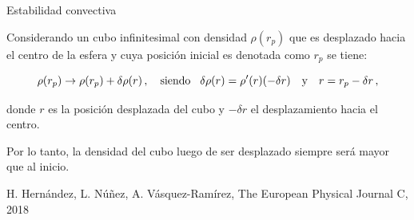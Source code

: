 \documentclass[handout,t]{beamer}
\begin{document}
\begin{frame}{Estabilidad convectiva}
\justifying

\vspace{2mm}
Considerando un cubo infinitesimal con densidad $\rho (r_{p})$ que es desplazado hacia el centro de la esfera y cuya posición inicial es denotada como $r_{p}$ se tiene:

\vspace{-2mm}

\begin{equation*}
    \rho (r_{p}) \rightarrow \rho (r_{p}) + \delta \rho(r) \, , \quad \text{siendo} \hspace{3mm} \delta \rho (r) = \rho^{\prime} (r)(- \delta r) \quad \text{y} \quad r = r_{p} - \delta r \, , 
\end{equation*}

\vspace{4mm}

donde $r$ es la posición desplazada del cubo y $- \delta r$ el desplazamiento hacia el centro.

\vspace{2mm}

Por lo tanto, la densidad del cubo luego de ser desplazado siempre será mayor que al inicio.

\vspace{10mm}

\tiny H. Hernández, L. Núñez, A. Vásquez-Ramírez, The European Physical Journal C, 2018
    
\end{frame}
\end{document}
